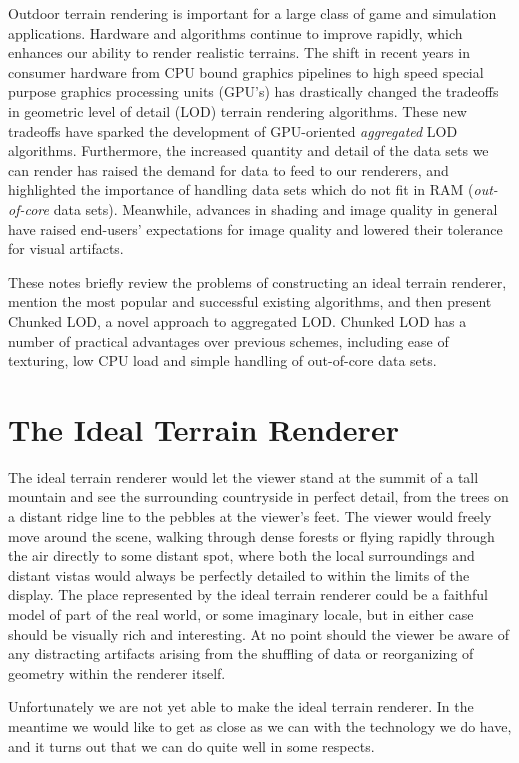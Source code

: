 \documentclass[12pt]{article}
\begin{document}
Outdoor terrain rendering is important for a large class of game and
simulation applications.  Hardware and algorithms continue to improve
rapidly, which enhances our ability to render realistic terrains.  The
shift in recent years in consumer hardware from CPU bound graphics
pipelines to high speed special purpose graphics processing units
(GPU's) has drastically changed the tradeoffs in geometric level of
detail (LOD) terrain rendering algorithms.  These new tradeoffs have
sparked the development of GPU-oriented {\em aggregated } LOD
algorithms.  Furthermore, the increased quantity and detail of the
data sets we can render has raised the demand for data to feed to our
renderers, and highlighted the importance of handling data sets which
do not fit in RAM ({\em out-of-core } data sets).  Meanwhile, advances
in shading and image quality in general have raised end-users'
expectations for image quality and lowered their tolerance for visual
artifacts.
 
These notes briefly review the problems of constructing an ideal
terrain renderer, mention the most popular and successful existing
algorithms, and then present Chunked LOD, a novel approach to
aggregated LOD.  Chunked LOD has a number of practical advantages over
previous schemes, including ease of texturing, low CPU load and simple
handling of out-of-core data sets.
 
\section{The Ideal Terrain Renderer}

The ideal terrain renderer would let the viewer stand at the summit of
a tall mountain and see the surrounding countryside in perfect detail,
from the trees on a distant ridge line to the pebbles at the
viewer's feet.  The viewer would freely move around the scene,
walking through dense forests or flying rapidly through the air
directly to some distant spot, where both the local surroundings and
distant vistas would always be perfectly detailed to within the limits
of the display.  The place represented by the ideal terrain renderer
could be a faithful model of part of the real world, or some imaginary
locale, but in either case should be visually rich and interesting.
At no point should the viewer be aware of any distracting artifacts
arising from the shuffling of data or reorganizing of geometry within
the renderer itself.
 
Unfortunately we are not yet able to make the ideal terrain renderer.
In the meantime we would like to get as close as we can with the
technology we do have, and it turns out that we can do quite well in
some respects.
 
\end{document}
